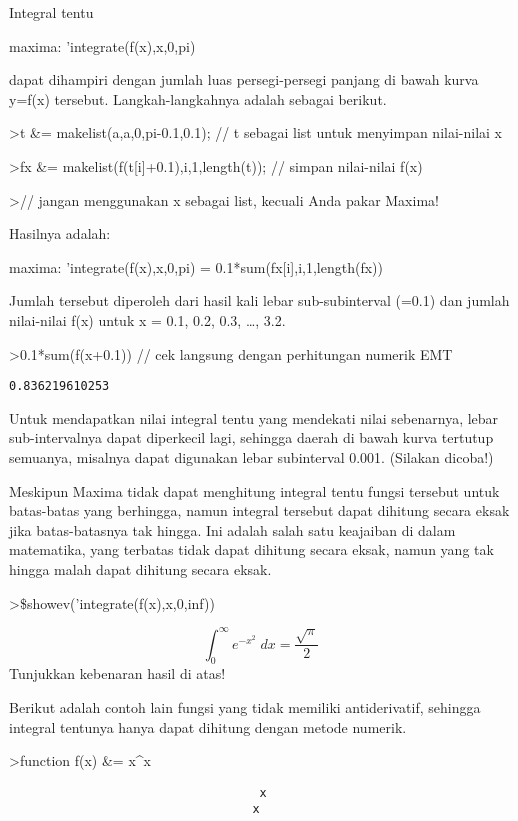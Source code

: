 \documentclass[
]{book}
\begin{document}
Integral tentu

maxima: 'integrate(f(x),x,0,pi)

dapat dihampiri dengan jumlah luas persegi-persegi panjang di bawah kurva y=f(x) tersebut. Langkah-langkahnya adalah sebagai berikut.

\textgreater t \&= makelist(a,a,0,pi-0.1,0.1); // t sebagai list untuk menyimpan nilai-nilai x

\textgreater fx \&= makelist(f(t{[}i{]}+0.1),i,1,length(t)); // simpan nilai-nilai f(x)

\textgreater// jangan menggunakan x sebagai list, kecuali Anda pakar Maxima!

Hasilnya adalah:

maxima: 'integrate(f(x),x,0,pi) = 0.1*sum(fx{[}i{]},i,1,length(fx))

Jumlah tersebut diperoleh dari hasil kali lebar sub-subinterval (=0.1) dan jumlah nilai-nilai f(x) untuk x = 0.1, 0.2, 0.3, \ldots, 3.2.

\textgreater0.1*sum(f(x+0.1)) // cek langsung dengan perhitungan numerik EMT

\begin{verbatim}
0.836219610253
\end{verbatim}

Untuk mendapatkan nilai integral tentu yang mendekati nilai sebenarnya, lebar sub-intervalnya dapat diperkecil lagi, sehingga daerah di bawah kurva tertutup semuanya, misalnya dapat digunakan lebar subinterval 0.001. (Silakan dicoba!)

Meskipun Maxima tidak dapat menghitung integral tentu fungsi tersebut untuk batas-batas yang berhingga, namun integral tersebut dapat dihitung secara eksak jika batas-batasnya tak hingga. Ini adalah salah satu keajaiban di dalam matematika, yang terbatas tidak dapat dihitung secara eksak, namun yang tak hingga malah dapat dihitung secara eksak.

\textgreater\$showev('integrate(f(x),x,0,inf))

\[\int_{0}^{\infty }{e^ {- x^2 }\;dx}=\frac{\sqrt{\pi}}{2}\]Tunjukkan kebenaran hasil di atas!

Berikut adalah contoh lain fungsi yang tidak memiliki antiderivatif, sehingga integral tentunya hanya dapat dihitung dengan metode numerik.

\textgreater function f(x) \&= x\^{}x

\begin{verbatim}
                                   x
                                  x
\end{verbatim}
\end{document}

